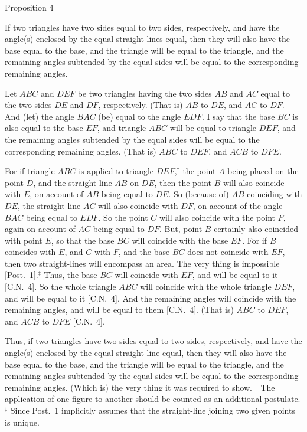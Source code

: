 
\begin{center}
{\large Proposition 4}
\end{center}

If two triangles have two  sides equal to two sides, respectively, and have the
angle(s) enclosed by the equal straight-lines equal, then
they will also have the base equal to the base, and the triangle will be equal
to the triangle,  and
the remaining angles subtended by the equal sides will be equal to the corresponding remaining angles.

\epsfysize=1.35in
\centerline{}

Let $ABC$ and $DEF$ be  two triangles having the two sides $AB$ and $AC$ equal to the two sides $DE$ and $DF$, respectively. (That is) $AB$ to $DE$, and $AC$ to $DF$. And (let) the angle $BAC$ (be) equal to the angle $EDF$. I say that the base $BC$ is also equal to the base
$EF$, and  triangle $ABC$ will be equal to triangle $DEF$, and the remaining angles
subtended by the equal sides will be equal to the corresponding remaining angles. (That is) $ABC$ to $DEF$, and $ACB$ to
$DFE$.

For if triangle $ABC$ is applied to triangle $DEF$,$^\dag$ the point $A$ being placed
on the point $D$, and the straight-line $AB$ on $DE$, then the point $B$ will also coincide with $E$, on account of $AB$ being equal to $DE$. So (because of) $AB$ coinciding with $DE$, the straight-line $AC$ will also coincide with $DF$, on account of the angle $BAC$ being equal to $EDF$. So the point $C$ will also coincide with the
point $F$,  again on account of $AC$ being equal to $DF$.  But,  point $B$  certainly also coincided with point $E$, so that the base $BC$ will coincide with the base $EF$.
For if $B$ coincides with $E$, and $C$ with $F$, and the base $BC$ does not coincide with $EF$, then two straight-lines will encompass an area. The very thing is impossible [Post.~1].$^\ddag$ Thus, the base $BC$ will coincide with $EF$, and will be equal to it [C.N.~4]. So  the whole triangle $ABC$ will coincide with the whole triangle $DEF$, and will be equal to it [C.N.~4]. And the remaining angles will coincide with the remaining angles, and  will be equal to them [C.N.~4]. (That is) $ABC$ to $DEF$, and $ACB$
to $DFE$ [C.N.~4].

Thus, if two triangles have two  sides equal to two sides, respectively, and have the
angle(s) enclosed by the equal straight-line equal, then
they will also have the base equal to the base, and the triangle will be equal
to the triangle,  and
the remaining angles subtended by the equal sides will be equal to the
corresponding remaining angles. (Which is) the very thing it was required to show.
{\footnotesize
\noindent $^\dag$ The application of one figure to another should be counted as an additional postulate.\\[0.5ex]
$^\ddag$ Since Post.~1 implicitly assumes that the straight-line
joining two given points is unique.}

